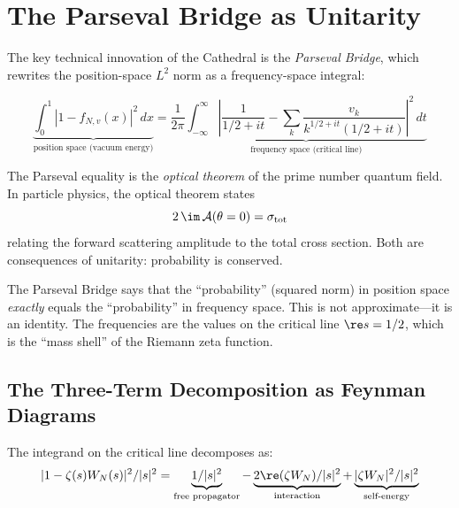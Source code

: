 \section{The Parseval Bridge as Unitarity}
\label{sec:parseval}

The key technical innovation of the Cathedral is the \emph{Parseval Bridge},
which rewrites the position-space $L^2$ norm as a frequency-space integral:

\[
  \underbrace{\int_0^1 |1 - f_{N,v}(x)|^2\,dx}_{\text{position space (vacuum energy)}}
  = \frac{1}{2\pi}\underbrace{\int_{-\infty}^{\infty}
  \left|\frac{1}{1/2+it} - \sum_k \frac{v_k}{k^{1/2+it}(1/2+it)}\right|^2\,dt}_{\text{frequency space (critical line)}}
\]

\begin{principle}
The Parseval equality is the \emph{optical theorem} of the prime number
quantum field. In particle physics, the optical theorem states
\[
  2\,\im\,\mathcal{A}(\theta=0) = \sigma_{\mathrm{tot}}
\]
relating the forward scattering amplitude to the total cross section.
Both are consequences of unitarity: probability is conserved.

The Parseval Bridge says that the ``probability'' (squared norm) in
position space \emph{exactly} equals the ``probability'' in frequency
space. This is not approximate---it is an identity. The frequencies
are the values on the critical line $\re s = 1/2$, which is the
``mass shell'' of the Riemann zeta function.
\end{principle}

\subsection{The Three-Term Decomposition as Feynman Diagrams}

The integrand on the critical line decomposes as:
\[
  |1 - \zeta(s)W_N(s)|^2 / |s|^2
  = \underbrace{1/|s|^2}_{\text{free propagator}}
  - \underbrace{2\re(\zeta W_N)/|s|^2}_{\text{interaction}}
  + \underbrace{|\zeta W_N|^2/|s|^2}_{\text{self-energy}}
\]

